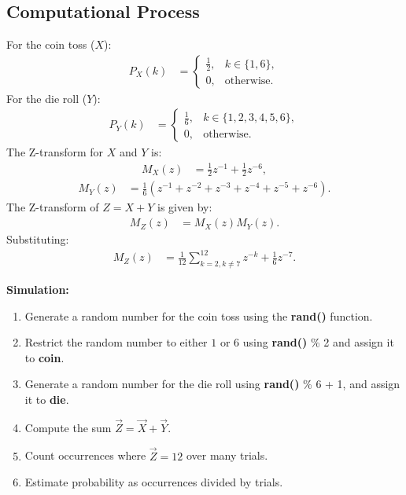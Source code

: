 \documentclass[journal]{IEEEtran}
\begin{document}
\subsection*{Computational Process}
For the coin toss ($X$):
\begin{align}
P_X(k) &= \begin{cases} 
\frac{1}{2}, & k \in \{1, 6\}, \\
0, & \text{otherwise}.
\end{cases}
\end{align}
For the die roll ($Y$):
\begin{align}
P_Y(k) &= \begin{cases} 
\frac{1}{6}, & k \in \{1, 2, 3, 4, 5, 6\}, \\
0, & \text{otherwise}.
\end{cases}
\end{align}
The Z-transform for $X$ and $Y$ is:
\begin{align}
M_X(z) &= \frac{1}{2} z^{-1} + \frac{1}{2} z^{-6},
\end{align}
\begin{align}
M_Y(z) &= \frac{1}{6} (z^{-1} + z^{-2} + z^{-3} + z^{-4} + z^{-5} + z^{-6}).
\end{align}
The Z-transform of $Z = X + Y$ is given by:
\begin{align}
M_Z(z) &= M_X(z) M_Y(z).
\end{align}
Substituting:
\begin{align}
M_Z(z) &= \frac{1}{12} \sum_{k=2, k \neq 7}^{12} z^{-k} + \frac{1}{6} z^{-7}.
\end{align}

\textbf{Simulation:} \\
\begin{enumerate}
    \item Generate a random number for the coin toss using the \textbf{rand()} function.
    \item Restrict the random number to either $1$ or $6$ using \textbf{rand()} \% 2 and assign it to \textbf{coin}.
    \item Generate a random number for the die roll using \textbf{rand()} \% 6 + 1, and assign it to \textbf{die}.
    \item Compute the sum $\vec{Z} = \vec{X} + \vec{Y}$.
    \item Count occurrences where $\vec{Z} = 12$ over many trials.
    \item Estimate probability as occurrences divided by trials.
\end{enumerate}
\end{document}
